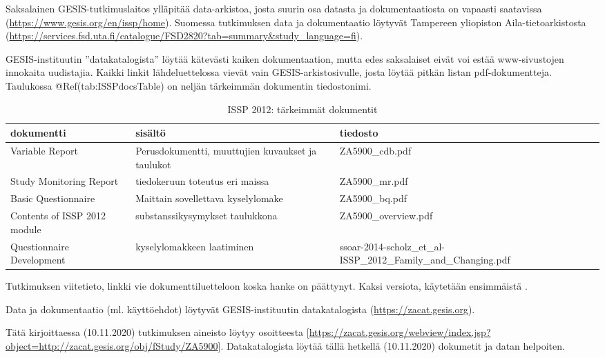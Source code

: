 \documentclass[
  finnish,
]{book}
\begin{document}
Saksalainen GESIS-tutkimuslaitos ylläpitää data-arkistoa, josta suurin osa
datasta ja dokumentaatiosta on vapaasti saatavissa
(\url{https://www.gesis.org/en/issp/home}). Suomessa tutkimuksen data ja dokumentaatio
löytyvät Tampereen yliopiston Aila-tietoarkistosta
(\url{https://services.fsd.uta.fi/catalogue/FSD2820?tab=summary\&study_language=fi}).

GESIS-instituutin ''datakatalogista'' löytää kätevästi kaiken dokumentaation,
mutta edes saksalaiset eivät voi estää www-sivustojen innokaita uudistajia.
Kaikki linkit lähdeluettelossa vievät vain GESIS-arkistosivulle,
josta löytää pitkän listan pdf-dokumentteja. Taulukossa @Ref(tab:ISSPdocsTable)
on neljän tärkeimmän dokumentin tiedostonimi.

\begin{table}

\caption{\label{tab:ISSPdocsTable} ISSP 2012: tärkeimmät dokumentit}
\centering
\begin{tabular}[t]{lll}
\toprule
dokumentti & sisältö & tiedosto\\
\midrule
Variable Report & Perusdokumentti, muuttujien kuvaukset ja taulukot & ZA5900\_cdb.pdf\\
Study Monitoring Report & tiedokeruun toteutus eri maissa & ZA5900\_mr.pdf\\
Basic Questionnaire & Maittain sovellettava kyselylomake & ZA5900\_bq.pdf\\
Contents of ISSP 2012 module & substanssikysymykset taulukkona & ZA5900\_overview.pdf\\
Questionnaire Development & kyselylomakkeen laatiminen & ssoar-2014-scholz\_et\_al-ISSP\_2012\_Family\_and\_Changing.pdf\\
\bottomrule
\end{tabular}
\end{table}

Tutkimuksen viitetieto, linkki vie dokumenttiluetteloon koska hanke on päättynyt.
Kaksi versiota, käytetään ensimmäistä \citep{RefWorks:doc:5b6c7b0de4b0fd36f5bb4c2a} .

Data ja dokumentaatio (ml. käyttöehdot) löytyvät GESIS-instituutin
datakatalogista (\url{https://zacat.gesis.org})\citep{RefWorks:doc:5b6c7f6ce4b0e4e15164ab1a}.

Tätä kirjoittaessa (10.11.2020) tutkimuksen aineisto löytyy osoitteesta
{[}\url{https://zacat.gesis.org/webview/index.jsp?object=http://zacat.gesis.org/obj/fStudy/ZA5900}{]}.
Datakatalogista löytää tällä hetkellä (10.11.2020) dokumetit ja datan helpoiten.
\end{document}
